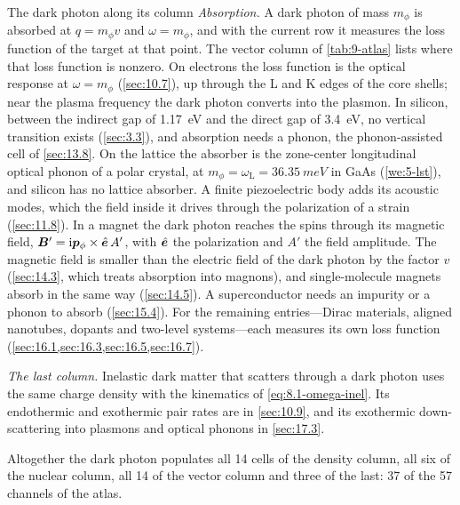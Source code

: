 \begin{workedexample}{The dark photon along its column}
\emph{Absorption.} A dark photon of mass $m_\phi$ is absorbed at $q = m_\phi v$ and $\omega = m_\phi$, and with the current row it measures the loss function of the target at that point. The vector column of \cref{tab:9-atlas} lists where that loss function is nonzero. On electrons the loss function is the optical response at $\omega = m_\phi$ (\cref{sec:10.7}), up through the L and K edges of the core shells; near the plasma frequency the dark photon converts into the plasmon. In silicon, between the indirect gap of \SI{1.17}{eV} and the direct gap of \SI{3.4}{eV}, no vertical transition exists (\cref{sec:3.3}), and absorption needs a phonon, the phonon-assisted cell of \cref{sec:13.8}. On the lattice the absorber is the zone-center longitudinal optical phonon of a polar crystal, at $m_\phi = \omega_{\mathrm{L}} = \SI{36.35}{meV}$ in GaAs (\cref{we:5-lst}), and silicon has no lattice absorber. A finite piezoelectric body adds its acoustic modes, which the field inside it drives through the polarization of a strain (\cref{sec:11.8}). In a magnet the dark photon reaches the spins through its magnetic field, $\bm{B}' = \mathrm{i}\bm{p}_\phi\times\hat{\bm{e}}\,A'$, with $\hat{\bm{e}}$ the polarization and $A'$ the field amplitude. The magnetic field is smaller than the electric field of the dark photon by the factor $v$ (\cref{sec:14.3}, which treats absorption into magnons), and single-molecule magnets absorb in the same way (\cref{sec:14.5}). A superconductor needs an impurity or a phonon to absorb (\cref{sec:15.4}). For the remaining entries---Dirac materials, aligned nanotubes, dopants and two-level systems---each measures its own loss function (\cref{sec:16.1,sec:16.3,sec:16.5,sec:16.7}).

\emph{The last column.} Inelastic dark matter that scatters through a dark photon uses the same charge density with the kinematics of \cref{eq:8.1-omega-inel}. Its endothermic and exothermic pair rates are in \cref{sec:10.9}, and its exothermic down-scattering into plasmons and optical phonons in \cref{sec:17.3}.

Altogether the dark photon populates all 14 cells of the density column, all six of the nuclear column, all 14 of the vector column and three of the last: 37 of the 57 channels of the atlas.
\end{workedexample}
